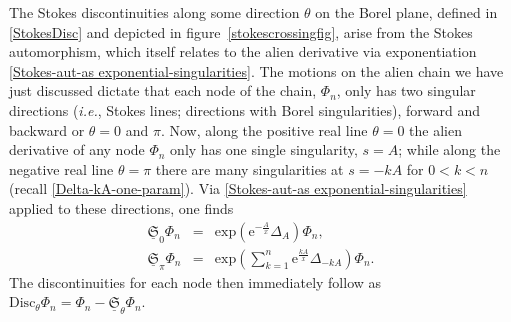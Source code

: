 \documentclass[11pt,a4paper]{article}
\def\disc{{\mathrm{Disc}}}
\newcommand{\rme}{{\mathrm{e}}}
\begin{document}
The Stokes discontinuities along some direction $\theta$ on the Borel plane, defined in \eqref{StokesDisc} and depicted in figure~\ref{stokescrossingfig}, arise from the Stokes automorphism, which itself relates to the alien derivative via exponentiation \eqref{Stokes-aut-as exponential-singularities}. The motions on the alien chain we have just discussed dictate that each node of the chain, $\Phi_n$, only has two singular directions (\textit{i.e.}, Stokes lines; directions with Borel singularities), forward and backward or $\theta=0$ and $\pi$. Now, along the positive real line $\theta=0$ the alien derivative of any node $\Phi_n$ only has one single singularity, $s=A$; while along the negative real line $\theta=\pi$ there are many singularities at $s=-kA$ for $0<k<n$ (recall \eqref{Delta-kA-one-param}). Via \eqref{Stokes-aut-as exponential-singularities} applied to these directions, one finds
%
\begin{eqnarray}
\label{one-param-stokes-0}
\underline{\mathfrak{S}}_0 \Phi_n &=& \mathrm{exp} \left( \rme^{-\frac{A}{x}} \Delta_{A} \right) \Phi_n, \\
\label{one-param-stokes-pi}
\underline{\mathfrak{S}}_{\pi} \Phi_n &=& \mathrm{exp} \left( \sum_{k=1}^{n} \rme^{\frac{kA}{x}} \Delta_{-kA} \right) \Phi_n.
\end{eqnarray}
%
\noindent
The discontinuities for each node then immediately follow as $\disc_{\theta} \Phi_n = \Phi_n - \underline{\mathfrak{S}}_{\theta} \Phi_n$.
\end{document}
